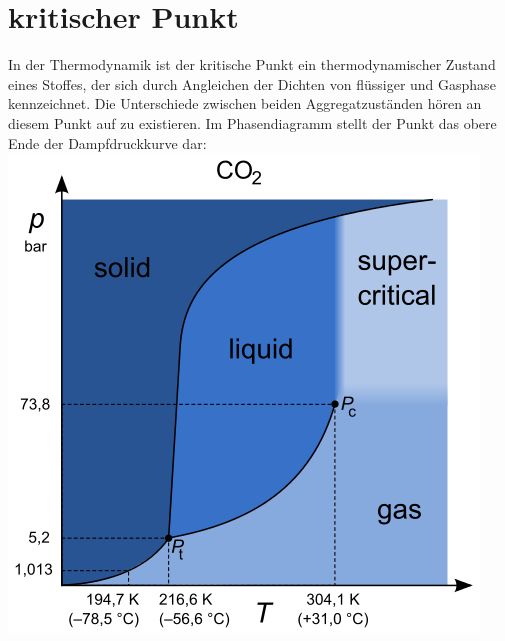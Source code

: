 \documentclass[10pt,a4paper]{article}
\begin{document}
\section{kritischer Punkt}
In der Thermodynamik ist der kritische Punkt ein thermodynamischer Zustand eines Stoffes, der sich durch Angleichen der Dichten von flüssiger und Gasphase kennzeichnet. Die Unterschiede zwischen beiden Aggregatzuständen hören an diesem Punkt auf zu existieren. Im Phasendiagramm stellt der Punkt das obere Ende der Dampfdruckkurve dar:
\includegraphics[scale=0.5]{472px-Carbon_dioxide_p-T_phase_diagram.png}\newpage
\end{document}
